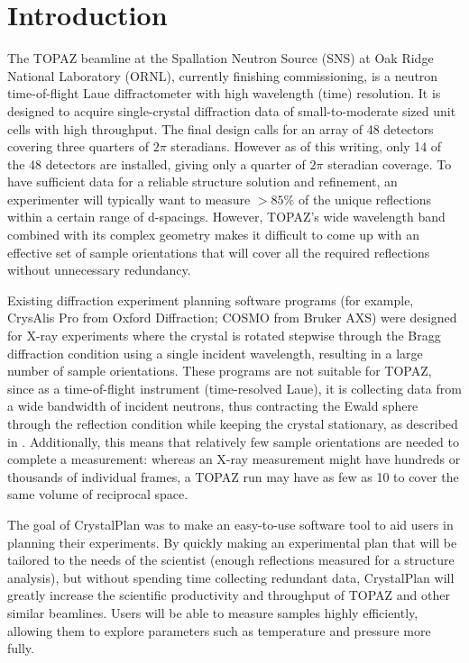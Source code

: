 \documentclass[final]{iucr}              %
\begin{document}
\section{Introduction}

The TOPAZ beamline at the Spallation Neutron Source (SNS) at Oak Ridge National
Laboratory (ORNL), currently finishing commissioning, is a neutron
time-of-flight Laue diffractometer with high wavelength (time) resolution. It
is designed to acquire single-crystal diffraction data of small-to-moderate sized unit cells with  high
throughput. The final design calls for an array of 48 detectors covering three
quarters of $2\pi$ steradians. However as of this writing, only 14 of the 48
detectors are installed, giving only a quarter of $2\pi$ steradian coverage. 
To have sufficient data for a reliable structure solution and
refinement, an experimenter will typically want to measure $ > 85\%$ of the
unique reflections within a certain range of d-spacings. However, TOPAZ's wide
wavelength band combined with its complex geometry makes it difficult to come up with
an effective set of sample orientations that will cover all the required reflections
without unnecessary redundancy.   


Existing diffraction experiment planning software programs (for example,
CrysAlis Pro from Oxford Diffraction; COSMO from Bruker AXS) were designed for
X-ray experiments where the crystal is rotated stepwise through the Bragg
diffraction condition using a single incident wavelength, 
resulting in a large number of sample orientations.
These programs are not suitable for TOPAZ, since as a time-of-flight instrument
(time-resolved Laue), it is collecting data from a wide
bandwidth of incident neutrons, thus contracting the Ewald sphere through the
reflection condition while keeping the crystal stationary, as described in
\cite{Schultz94,Wilson00}.
 Additionally, this means that relatively few sample
orientations are needed to complete a measurement: whereas an X-ray measurement might have
hundreds or thousands of individual frames, a TOPAZ run may have as few as 10
to cover the same volume of reciprocal space.


The goal of CrystalPlan was to make an easy-to-use software tool to aid users in
planning their experiments. By quickly making an experimental plan that will be
tailored to the needs of the scientist (enough reflections measured for a structure
analysis), but without spending time collecting redundant data, CrystalPlan will
greatly increase the scientific productivity and throughput of TOPAZ and other
similar beamlines. Users will be able to measure samples highly efficiently,
allowing them to explore parameters such as temperature and pressure more fully.
 
\end{document}
